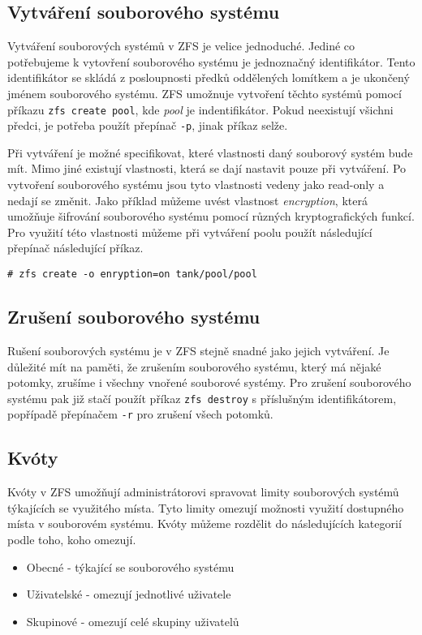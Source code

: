 \subsection{Vytváření souborového systému}
\label{createfs}
Vytváření souborových systémů v ZFS je velice jednoduché. Jediné co potřebujeme k vytovření souborového systému je jednoznačný identifikátor. Tento identifikátor se skládá z posloupnosti předků oddělených lomítkem a je ukončený jménem souborového systému. ZFS umožnuje vytvoření těchto systémů pomocí příkazu \verb|zfs create pool|, kde \emph{pool} je indentifikátor. Pokud neexistují všichni předci, je potřeba použít přepínač \verb|-p|, jinak příkaz selže.

Při vytváření je možné specifikovat, které vlastnosti daný souborový systém bude mít. Mimo jiné existují vlastnosti, která se dají nastavit pouze při vytváření. Po vytvoření souborového systému jsou tyto vlastnosti vedeny jako read-only a nedají se změnit. Jako příklad můžeme uvést vlastnost \emph{encryption}, která umožňuje šifrování souborového systému pomocí různých kryptografických funkcí. Pro využití této vlastnosti můžeme při vytváření poolu použít následující přepínač následující příkaz.
\begin{verbatim}
# zfs create -o enryption=on tank/pool/pool
\end{verbatim}
\subsection{Zrušení souborového systému}
Rušení souborových systému je v ZFS stejně snadné jako jejich vytváření. Je důležité mít na paměti, že zrušením souborového systému, který má nějaké potomky, zrušíme i všechny vnořené souborové systémy. Pro zrušení souborového systému pak již stačí použít příkaz \verb|zfs destroy| s příslušným identifikátorem, popřípadě přepínačem \verb|-r| pro zrušení všech potomků.
\subsection{Kvóty}
\label{quota}

Kvóty v ZFS umožňují administrátorovi spravovat limity souborových systémů týkajících se využitého místa. Tyto limity omezují možnosti využití dostupného místa v souborovém systému. Kvóty můžeme rozdělit do následujících kategorií podle toho, koho omezují.
\begin{itemize}
  \item Obecné - týkající se souborového systému
  \item Uživatelské - omezují jednotlivé uživatele
  \item Skupinové - omezují celé skupiny uživatelů
\end{itemize}

